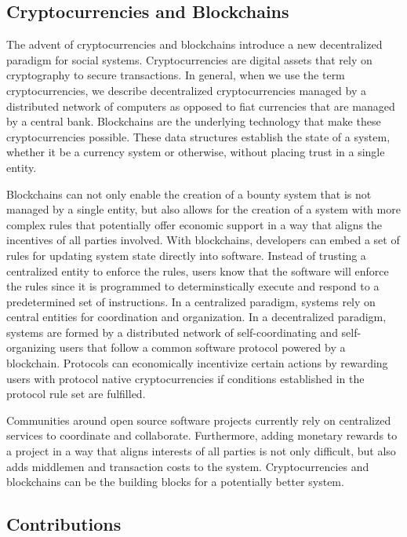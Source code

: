 \subsection{Cryptocurrencies and Blockchains}

The advent of cryptocurrencies and blockchains introduce a new decentralized
paradigm for social systems. Cryptocurrencies are digital assets that rely on
cryptography to secure transactions. In general, when we use the term
cryptocurrencies, we describe decentralized
cryptocurrencies managed by a distributed network of computers as opposed to
fiat currencies that are managed by a central bank. Blockchains are the
underlying technology that make these cryptocurrencies possible. These data
structures establish the state of a system, whether it be a currency system or
otherwise, without placing trust in a single entity.

Blockchains can not only enable the creation of a bounty system that is not
managed by a single entity, but also allows for the creation of a system with
more complex rules that potentially offer economic support in a way that aligns the
incentives of all parties involved. With blockchains, developers can embed a set
of rules for updating system state directly into software. Instead of trusting a
centralized entity to enforce the rules, users know that the software will
enforce the rules since it is programmed to determinstically execute and respond
to a predetermined set of instructions. In a centralized paradigm, systems rely
on central entities for coordination and organization. In a decentralized
paradigm, systems are formed by a distributed network of self-coordinating and
self-organizing users that follow a common software protocol powered by a
blockchain. Protocols can economically incentivize certain actions by rewarding
users with protocol native cryptocurrencies if conditions established in the
protocol rule set are fulfilled.

Communities around open source software projects currently rely on centralized
services to coordinate and collaborate. Furthermore, adding monetary rewards to a project in
a way that aligns interests of all parties is not only difficult, but also adds
middlemen and transaction costs to the system. Cryptocurrencies and
blockchains can be the building blocks for a potentially better system.

\subsection{Contributions}


